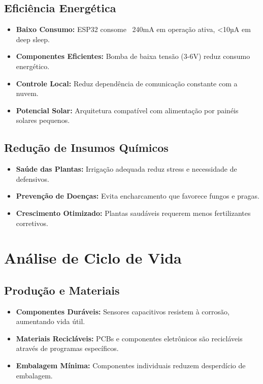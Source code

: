 \subsection{Eficiência Energética}
\begin{itemize}
    \item \textbf{Baixo Consumo:} ESP32 consome ~240mA em operação ativa, <10µA em deep sleep.
    \item \textbf{Componentes Eficientes:} Bomba de baixa tensão (3-6V) reduz consumo energético.
    \item \textbf{Controle Local:} Reduz dependência de comunicação constante com a nuvem.
    \item \textbf{Potencial Solar:} Arquitetura compatível com alimentação por painéis solares pequenos.
\end{itemize}

\subsection{Redução de Insumos Químicos}
\begin{itemize}
    \item \textbf{Saúde das Plantas:} Irrigação adequada reduz stress e necessidade de defensivos.
    \item \textbf{Prevenção de Doenças:} Evita encharcamento que favorece fungos e pragas.
    \item \textbf{Crescimento Otimizado:} Plantas saudáveis requerem menos fertilizantes corretivos.
\end{itemize}

\section{Análise de Ciclo de Vida}

\subsection{Produção e Materiais}
\begin{itemize}
    \item \textbf{Componentes Duráveis:} Sensores capacitivos resistem à corrosão, aumentando vida útil.
    \item \textbf{Materiais Recicláveis:} PCBs e componentes eletrônicos são recicláveis através de programas específicos.
    \item \textbf{Embalagem Mínima:} Componentes individuais reduzem desperdício de embalagem.
\end{itemize}

